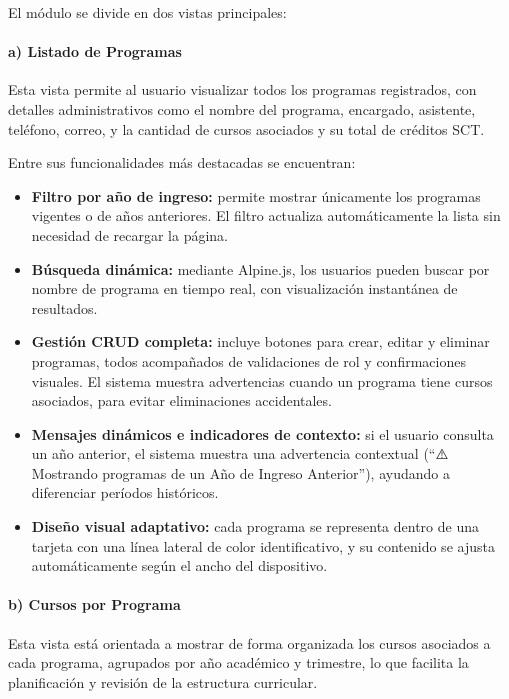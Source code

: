 El módulo se divide en dos vistas principales:

\paragraph{a) Listado de Programas}

Esta vista permite al usuario visualizar todos los programas registrados, con detalles administrativos como el nombre del programa, encargado, asistente, teléfono, correo, y la cantidad de cursos asociados y su total de créditos SCT.

Entre sus funcionalidades más destacadas se encuentran:

\begin{itemize}
    \item \textbf{Filtro por año de ingreso:} permite mostrar únicamente los programas vigentes o de años anteriores. El filtro actualiza automáticamente la lista sin necesidad de recargar la página.
    
    \item \textbf{Búsqueda dinámica:} mediante Alpine.js, los usuarios pueden buscar por nombre de programa en tiempo real, con visualización instantánea de resultados.
    
    \item \textbf{Gestión CRUD completa:} incluye botones para crear, editar y eliminar programas, todos acompañados de validaciones de rol y confirmaciones visuales. El sistema muestra advertencias cuando un programa tiene cursos asociados, para evitar eliminaciones accidentales.
    
    \item \textbf{Mensajes dinámicos e indicadores de contexto:} si el usuario consulta un año anterior, el sistema muestra una advertencia contextual (``⚠️ Mostrando programas de un Año de Ingreso Anterior''), ayudando a diferenciar períodos históricos.
    
    \item \textbf{Diseño visual adaptativo:} cada programa se representa dentro de una tarjeta con una línea lateral de color identificativo, y su contenido se ajusta automáticamente según el ancho del dispositivo.
\end{itemize}

\paragraph{b) Cursos por Programa}

Esta vista está orientada a mostrar de forma organizada los cursos asociados a cada programa, agrupados por año académico y trimestre, lo que facilita la planificación y revisión de la estructura curricular.

